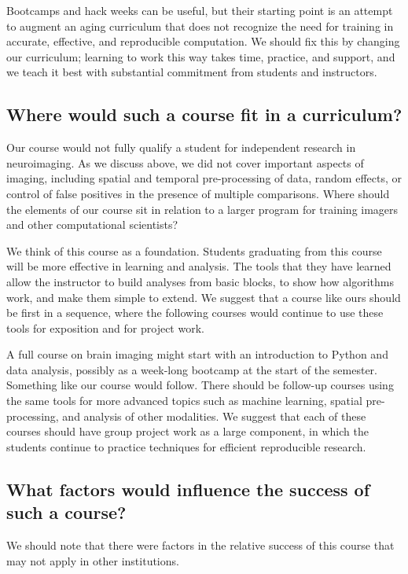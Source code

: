 Bootcamps and hack weeks can be useful, but their starting point is an
attempt to augment an aging curriculum that does not recognize the need for
training in accurate, effective, and reproducible computation.  We should fix
this by changing our curriculum; learning to work this way takes time,
practice, and support, and we teach it best with substantial commitment from
students and instructors.

\subsection{Where would such a course fit in a curriculum?}

Our course would not fully qualify a student for independent research in
neuroimaging.  As we discuss above, we did not cover important aspects of
imaging, including spatial and temporal pre-processing of data, random effects,
or control of false positives in the presence of multiple comparisons.  Where
should the elements of our course sit in relation to a larger program for
training imagers and other computational scientists?

We think of this course as a foundation.  Students graduating from this course
will be more effective in learning and analysis.  The tools that they have
learned allow the instructor to build analyses from basic blocks, to
show how algorithms work, and make them simple to extend.  We
suggest that a course like ours should be first in a sequence, where the
following courses would continue to use these tools for exposition and for
project work.

A full course on brain imaging might start with an introduction to Python and
data analysis, possibly as a week-long bootcamp at the start of the semester.
Something like our course would follow.  There should be follow-up courses
using the same tools for more advanced topics such as machine learning,
spatial pre-processing, and analysis of other modalities. We suggest that each
of these courses should have group project work as a large component, in which
the students continue to practice techniques for efficient reproducible
research.

\subsection{What factors would influence the success of such a course?}

We should note that there were factors in the relative success of this
course that may not apply in other institutions.

